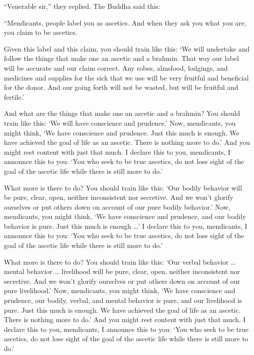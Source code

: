 \documentclass[12pt,openany]{book}%
\begin{document}
“Venerable sir,” they replied. The Buddha said this: 

“Mendicants, people label you as ascetics. And when they ask you what you are, you claim to be ascetics. 

Given this label and this claim, you should train like this: ‘We will undertake and follow the things that make one an ascetic and a brahmin. That way our label will be accurate and our claim correct. Any robes, almsfood, lodgings, and medicines and supplies for the sick that we use will be very fruitful and beneficial for the donor. And our going forth will not be wasted, but will be fruitful and fertile.’ 

And what are the things that make one an ascetic and a brahmin? You should train like this: ‘We will have conscience and prudence.’ Now, mendicants, you might think, ‘We have conscience and prudence. Just this much is enough. We have achieved the goal of life as an ascetic. There is nothing more to do.’ And you might rest content with just that much. I declare this to you, mendicants, I announce this to you: ‘You who seek to be true ascetics, do not lose sight of the goal of the ascetic life while there is still more to do.’ 

What more is there to do? You should train like this: ‘Our bodily behavior will be pure, clear, open, neither inconsistent nor secretive. And we won’t glorify ourselves or put others down on account of our pure bodily behavior.’ Now, mendicants, you might think, ‘We have conscience and prudence, and our bodily behavior is pure. Just this much is enough …’ I declare this to you, mendicants, I announce this to you: ‘You who seek to be true ascetics, do not lose sight of the goal of the ascetic life while there is still more to do.’ 

What more is there to do? You should train like this: ‘Our verbal behavior … mental behavior … livelihood will be pure, clear, open, neither inconsistent nor secretive. And we won’t glorify ourselves or put others down on account of our pure livelihood.’ Now, mendicants, you might think, ‘We have conscience and prudence, our bodily, verbal, and mental behavior is pure, and our livelihood is pure. Just this much is enough. We have achieved the goal of life as an ascetic. There is nothing more to do.’ And you might rest content with just that much. I declare this to you, mendicants, I announce this to you: ‘You who seek to be true ascetics, do not lose sight of the goal of the ascetic life while there is still more to do.’ 
\end{document}
